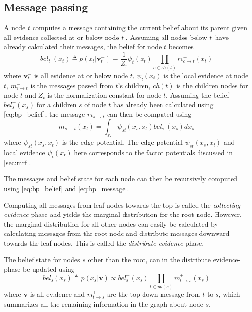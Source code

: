 \subsection{Message passing}
A node $t$ computes a message containing the current belief about its parent given all evidence collected at or below node $t$ \cite{murphy}. Assuming all nodes below $t$ have already calculated their messages, the belief for node $t$ becomes
\begin{equation}\label{eq:bp_belief}
    bel_t^-(x_t) \triangleq p(x_t | \mathbf{v}_t^-) = \frac{1}{Z_t}\psi_t(x_t) \prod_{c \in ch(t)} m_{c\to t}^-(x_t)
\end{equation}
where $\mathbf{v}_t^-$ is all evidence at or below node $t$, $\psi_t(x_t)$ is the local evidence at node $t$, $m_{c \to t}^-$ is the messages passed from $t$'s children, $ch(t)$ is the children nodes for node $t$ and $Z_t$ is the normalization constant for node $t$.
Assuming the belief $bel_s^-(x_s)$ for a children $s$ of node $t$ has already been calculated using \cref{eq:bp_belief},  the message $m_{s\to t}^-$ can then be computed using
\begin{equation}\label{eq:bp_message}
    m_{s \to t}^-(x_t) = \int_{x_s} \psi_{st}(x_s, x_t) bel_s^-(x_s) dx_s
\end{equation}
where $\psi_{st}(x_s, x_t)$ is the edge potential. The edge potential $\psi_{st}(x_s, x_t)$ and local evidence $\psi_t(x_t)$ here corresponds to the factor potentials discussed in \cref{sec:mrf}.

The messages and belief state for each node can then be recursively computed using \cref{eq:bp_belief} and \cref{eq:bp_message}.



Computing all messages from leaf nodes towards the top is called the \textit{collecting evidence}-phase and yields the marginal distribution for the root node. However, the marginal distribution for all other nodes can easily be calculated by calculating messages from the root node and distribute messages downward towards the leaf nodes. This is called the \textit{distribute evidence}-phase. 

The belief state for nodes $s$ other than the root, can in the distribute evidence-phase be updated using
\begin{equation}\label{eq:bp_belief_top_down}
    bel_s(x_s) \triangleq p(x_s | \mathbf{v}) \propto bel_s^-(x_s) \prod_{t \in pa(s)} m_{t \to s}^+(x_s)
\end{equation}
where $\mathbf{v}$ is all evidence and $m_{t \to s}^+$ are the top-down message from $t$ to $s$, which summarizes all the remaining information in the graph about node $s$. 

